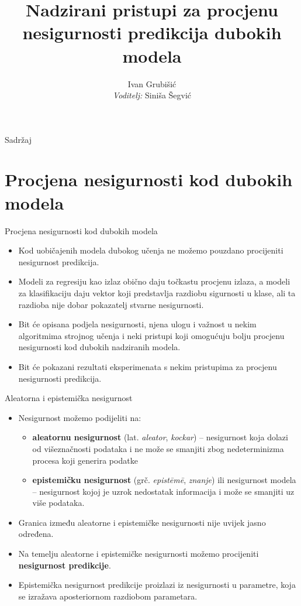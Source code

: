 \documentclass{beamer}
\title{Nadzirani pristupi za procjenu nesigurnosti predikcija dubokih modela}
\author{Ivan Grubišić \\ \emph{Voditelj:} Siniša Šegvić}
\institute{Fakultet elektrotehnike i računarstva}
\date{}
\begin{document}
	
\begin{frame}
  \titlepage
\end{frame}

\begin{frame}{Sadržaj}
  \tableofcontents
\end{frame}


\section{Procjena nesigurnosti kod dubokih modela}

\begin{frame}{Procjena nesigurnosti kod dubokih modela}
	\begin{itemize}
		\item Kod uobičajenih modela dubokog učenja ne možemo pouzdano procijeniti nesigurnost predikcija. 
		\item Modeli za regresiju kao izlaz obično daju točkastu procjenu izlaza, a modeli za klasifikaciju daju vektor koji predstavlja razdiobu sigurnosti u klase, ali ta razdioba nije dobar pokazatelj stvarne nesigurnosti.
	\end{itemize}
	\begin{itemize}
		\item Bit će opisana podjela nesigurnosti, njena ulogu i važnost u nekim algoritmima strojnog učenja i neki pristupi koji omogućuju bolju procjenu nesigurnosti kod dubokih nadziranih modela.
		\item Bit će pokazani rezultati eksperimenata s nekim pristupima za procjenu nesigurnosti predikcija.
	\end{itemize}
\end{frame}

\begin{frame}{Aleatorna i epistemička nesigurnost}
	\begin{itemize}
		\item Nesigurnost možemo podijeliti \citep{Kiureghian:2009:AEDM} na: 
		\begin{itemize}
			\item \textbf{aleatornu nesigurnost} (lat. \textit{aleator}, \textit{kockar}) -- nesigurnost koja dolazi od višeznačnosti podataka i ne može se smanjiti zbog nedeterminizma procesa koji generira podatke
			\item \textbf{epistemičku nesigurnost} (grč. \textit{epist\={e}m\={e}}, \textit{znanje}) ili nesigurnost modela -- nesigurnost kojoj je uzrok nedostatak informacija i može se smanjiti uz više podataka.
		\end{itemize}
		\item Granica između aleatorne i epistemičke nesigurnosti nije uvijek jasno određena.
		\item Na temelju aleatorne i epistemičke nesigurnosti možemo procijeniti \textbf{nesigurnost predikcije}. 
		\item Epistemička nesigurnost predikcije proizlazi iz nesigurnosti u parametre, koja se izražava aposteriornom razdiobom parametara. 
	\end{itemize}
\end{frame}
\end{document}
